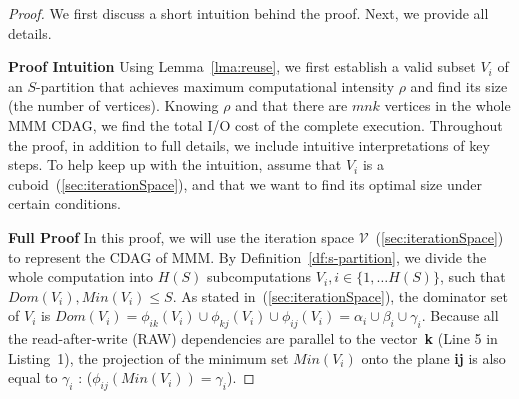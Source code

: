 \documentclass[sigplan,review,anonymous]{acmart}\settopmatter{printfolios=true,printccs=false,printacmref=false}
\newcommand\greg[1]{\textcolor{blue}{[Greg: #1]}}
\newcommand\mac[1]{\textcolor{red}{[Mac: #1]}}
\newcommand{\macb}[1]{\textbf{\textsf{#1}}}
\begin{document}
\begin{proof}

We first discuss a short intuition behind
the proof. Next, we provide all details.

\macb{Proof Intuition}
%
Using Lemma~\ref{lma:reuse}, we first establish a valid subset $V_i$ of an
$S$-partition that achieves maximum computational intensity $\rho$ and find its
size (the number of vertices). Knowing $\rho$ and that there are $mnk$
vertices in the whole MMM CDAG, we find the total
I/O cost of the complete execution. Throughout the proof, in addition to
full details, we include intuitive interpretations of key steps. To
help keep up with the intuition, assume that $V_i$ is a 
cuboid~(\cref{sec:iterationSpace}), and that we want to find its optimal size 
under certain conditions.

%  

\macb{Full Proof}
%
In this proof, we will use the iteration space 
$\mathcal{V}$~(\cref{sec:iterationSpace}) to represent the 
CDAG of MMM.
By Definition~\ref{df:s-partition}, we divide the whole computation into
$H(S)$ subcomputations $V_i, i \in \{1,\dots H(S)\}$, such that $Dom(V_i), 
Min(V_i) \le 
S$. As stated in~(\cref{sec:iterationSpace}), the dominator set of 
$V_i$ is $Dom(V_i) =\phi_{ik}(V_i) \cup \phi_{kj}(V_i) \cup \phi_{ij}(V_i) = 
\alpha_i \cup \beta_i \cup \gamma_i$. Because all the read-after-write (RAW) 
dependencies are parallel to the vector~\textbf{k} (Line 5 in 
Listing~1), the projection of the minimum set $Min(V_i)$ onto the plane 
\textbf{ij} is also equal to $\gamma_i$ : ($\phi_{ij}(Min(V_i)) = \gamma_i$).


\end{proof}
\end{document}

